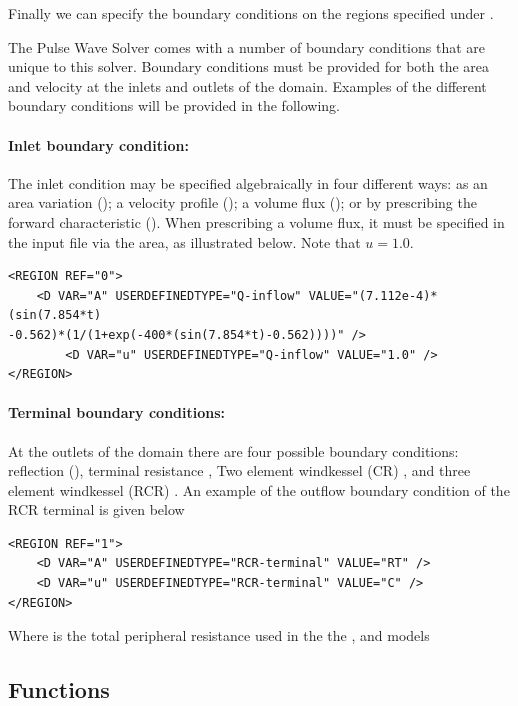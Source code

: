 Finally we can specify the boundary conditions on the regions specified under .

The Pulse Wave Solver comes with a number of boundary conditions that are unique to this solver. Boundary conditions must be provided for both the area and velocity at the inlets and outlets of the domain. Examples of the different boundary conditions will be provided in the following.

\paragraph{Inlet boundary condition:~} The inlet condition may be specified algebraically in four different ways: as an area variation (); a velocity profile (); a volume flux (); or by prescribing the forward characteristic (). When prescribing a volume flux, it must be specified in the input file via the area, as illustrated below. Note that $u = 1.0$.

\begin{lstlisting}[style=XmlStyle]
<REGION REF="0">
	<D VAR="A" USERDEFINEDTYPE="Q-inflow" VALUE="(7.112e-4)*(sin(7.854*t)
-0.562)*(1/(1+exp(-400*(sin(7.854*t)-0.562))))" />
        <D VAR="u" USERDEFINEDTYPE="Q-inflow" VALUE="1.0" />
</REGION>
\end{lstlisting}

\paragraph{Terminal boundary conditions:~} At the outlets of the domain there are four possible boundary conditions: reflection (), terminal resistance ,
Two element windkessel (CR)  , and three element windkessel (RCR) .  An example of the outflow boundary condition of the RCR terminal is given below
\begin{lstlisting}[style=XmlStyle]
<REGION REF="1">
	<D VAR="A" USERDEFINEDTYPE="RCR-terminal" VALUE="RT" />
	<D VAR="u" USERDEFINEDTYPE="RCR-terminal" VALUE="C" />
</REGION>
\end{lstlisting}
Where  is the total peripheral resistance  used in the the  ,  and   models

\subsection{Functions}

